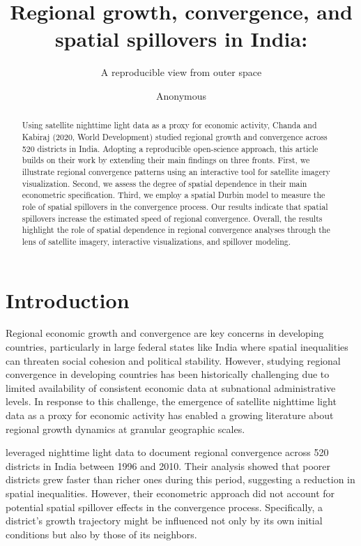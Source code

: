 \documentclass[
  a4paper, 
  twoside,
  review
]{article}
\title{Regional growth, convergence, and spatial spillovers in India:}
\subtitle{A reproducible view from outer space}
\author{%
Anonymous}
\date{}
\begin{document}
\maketitle
\begin{abstract}
Using satellite nighttime light data as a proxy for economic activity,
Chanda and Kabiraj (2020, World Development) studied regional growth and
convergence across 520 districts in India. Adopting a reproducible
open-science approach, this article builds on their work by extending
their main findings on three fronts. First, we illustrate regional
convergence patterns using an interactive tool for satellite imagery
visualization. Second, we assess the degree of spatial dependence in
their main econometric specification. Third, we employ a spatial Durbin
model to measure the role of spatial spillovers in the convergence
process. Our results indicate that spatial spillovers increase the
estimated speed of regional convergence. Overall, the results highlight
the role of spatial dependence in regional convergence analyses through
the lens of satellite imagery, interactive visualizations, and spillover
modeling.
\end{abstract}


\section{Introduction}\label{introduction}

Regional economic growth and convergence are key concerns in developing
countries, particularly in large federal states like India where spatial
inequalities can threaten social cohesion and political stability.
However, studying regional convergence in developing countries has been
historically challenging due to limited availability of consistent
economic data at subnational administrative levels. In response to this
challenge, the emergence of satellite nighttime light data as a proxy
for economic activity has enabled a growing literature about regional
growth dynamics at granular geographic scales.

\citet{chanda_kabiraj_district_convergence} leveraged nighttime light
data to document regional convergence across 520 districts in India
between 1996 and 2010. Their analysis showed that poorer districts grew
faster than richer ones during this period, suggesting a reduction in
spatial inequalities. However, their econometric approach did not
account for potential spatial spillover effects in the convergence
process. Specifically, a district's growth trajectory might be
influenced not only by its own initial conditions but also by those of
its neighbors.
\end{document}
